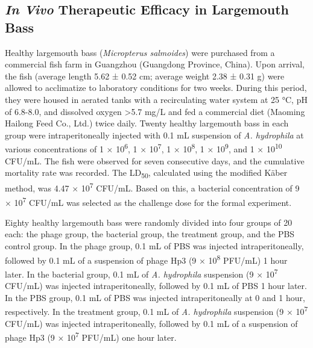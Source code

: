 \subsection{\texorpdfstring{\emph{In Vivo} Therapeutic Efficacy in
Largemouth
Bass}{\emph{In Vivo} Therapeutic Efficacy in Largemouth Bass}}\label{in-vivo-therapeutic-efficacy-in-largemouth-bass}

Healthy largemouth bass (\emph{Micropterus salmoides}) were purchased
from a commercial fish farm in Guangzhou (Guangdong Province, China).
Upon arrival, the fish (average length 5.62 ± 0.52 cm; average weight
2.38 ± 0.31 g) were allowed to acclimatize to laboratory conditions for
two weeks. During this period, they were housed in aerated tanks with a
recirculating water system at 25 °C, pH of 6.8-8.0, and dissolved oxygen
\textgreater5.7 mg/L and fed a commercial diet (Maoming Hailong Feed
Co., Ltd.) twice daily. Twenty healthy largemouth bass in each group
were intraperitoneally injected with 0.1 mL suspension of \emph{A.
hydrophila} at various concentrations of 1 × 10\textsuperscript{6}, 1 ×
10\textsuperscript{7}, 1 × 10\textsuperscript{8}, 1 ×
10\textsuperscript{9}, and 1 × 10\textsuperscript{10} CFU/mL. The fish
were observed for seven consecutive days, and the cumulative mortality
rate was recorded. The LD\textsubscript{50}, calculated using the
modified Käber method, was 4.47 × 10\textsuperscript{7} CFU/mL. Based on
this, a bacterial concentration of 9 × 10\textsuperscript{7} CFU/mL was
selected as the challenge dose for the formal experiment.

Eighty healthy largemouth bass were randomly divided into four groups of
20 each: the phage group, the bacterial group, the treatment group, and
the PBS control group. In the phage group, 0.1 mL of PBS was injected
intraperitoneally, followed by 0.1 mL of a suspension of phage Hp3 (9 ×
10\textsuperscript{8} PFU/mL) 1 hour later. In the bacterial group, 0.1
mL of \emph{A. hydrophila} suspension (9 × 10\textsuperscript{7} CFU/mL)
was injected intraperitoneally, followed by 0.1 mL of PBS 1 hour later.
In the PBS group, 0.1 mL of PBS was injected intraperitoneally at 0 and
1 hour, respectively. In the treatment group, 0.1 mL of \emph{A.
hydrophila} suspension (9 × 10\textsuperscript{7} CFU/mL) was injected
intraperitoneally, followed by 0.1 mL of a suspension of phage Hp3 (9 ×
10\textsuperscript{7} PFU/mL) one hour later.

